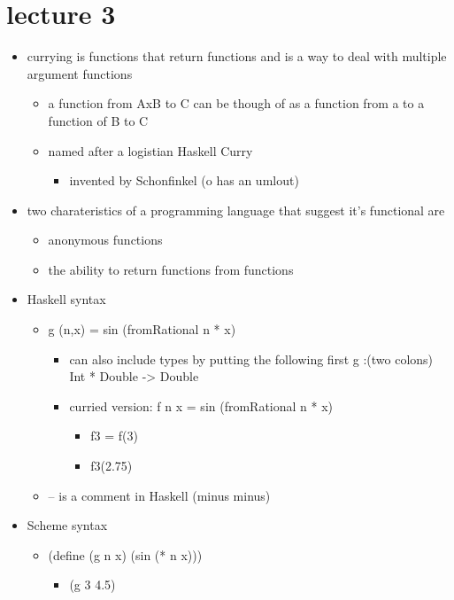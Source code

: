 \documentclass[11pt]{article}
\begin{document}
\section{lecture 3}
\label{sec-2}
\begin{itemize}
\item currying is functions that return functions and is a way to deal with multiple argument functions
\begin{itemize}
\item a function from AxB to C can be though of as a function from a to a function of B to C
\item named after a logistian Haskell Curry
\begin{itemize}
\item invented by Schonfinkel (o has an umlout)
\end{itemize}
\end{itemize}
\item two charateristics of a programming language that suggest it's functional are
\begin{itemize}
\item anonymous functions
\item the ability to return functions from functions
\end{itemize}
\item Haskell syntax
\begin{itemize}
\item g (n,x) = sin (fromRational n * x)
\begin{itemize}
\item can also include types by putting the following first g :(two colons) Int * Double -> Double
\item curried version: f n x = sin (fromRational n * x)
\begin{itemize}
\item f3 = f(3)
\item f3(2.75)
\end{itemize}
\end{itemize}
\item -- is a comment in Haskell (minus minus)
\end{itemize}
\item Scheme syntax
\begin{itemize}
\item (define (g n x) (sin (* n x)))
\begin{itemize}
\item (g 3 4.5)
\end{itemize}
\end{itemize}
\end{itemize}
\end{document}

